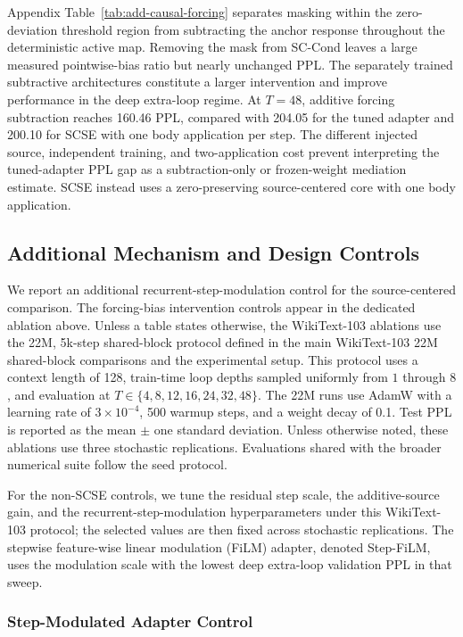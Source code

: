 \documentclass[letterpaper]{article} %
\newcommand{\SCSE}{\textsc{SCSE}}
\theoremstyle{remark}
\begin{document}
Appendix Table~\ref{tab:add-causal-forcing} separates masking within the zero-deviation threshold region from subtracting the anchor response throughout the deterministic active map.  Removing the mask from SC-Cond leaves a large measured pointwise-bias ratio but nearly unchanged PPL.  The separately trained subtractive architectures constitute a larger intervention and improve performance in the deep extra-loop regime.  At $T=48$, additive forcing subtraction reaches 160.46 PPL, compared with 204.05 for the tuned adapter and 200.10 for \SCSE{} with one body application per step.  The different injected source, independent training, and two-application cost prevent interpreting the tuned-adapter PPL gap as a subtraction-only or frozen-weight mediation estimate.  \SCSE{} instead uses a zero-preserving source-centered core with one body application.

\subsection{Additional Mechanism and Design Controls}
\label{app:add-exp}

We report an additional recurrent-step-modulation control for the source-centered comparison.  The forcing-bias intervention controls appear in the dedicated ablation above.  Unless a table states otherwise, the WikiText-103 ablations use the 22M, 5k-step shared-block protocol defined in the main WikiText-103 22M shared-block comparisons and the experimental setup.  This protocol uses a context length of 128, train-time loop depths sampled uniformly from $1$ through $8$, and evaluation at $T\in\{4,8,12,16,24,32,48\}$.  The 22M runs use AdamW with a learning rate of $3\times 10^{-4}$, 500 warmup steps, and a weight decay of 0.1.  Test PPL is reported as the mean $\pm$ one standard deviation.  Unless otherwise noted, these ablations use three stochastic replications.  Evaluations shared with the broader numerical suite follow the seed protocol.

For the non-\SCSE{} controls, we tune the residual step scale, the additive-source gain, and the recurrent-step-modulation hyperparameters under this WikiText-103 protocol; the selected values are then fixed across stochastic replications.  The stepwise feature-wise linear modulation (FiLM) adapter, denoted Step-FiLM, uses the modulation scale with the lowest deep extra-loop validation PPL in that sweep.

\subsubsection{Step-Modulated Adapter Control}
\label{app:step-modulated-control}
\end{document}

